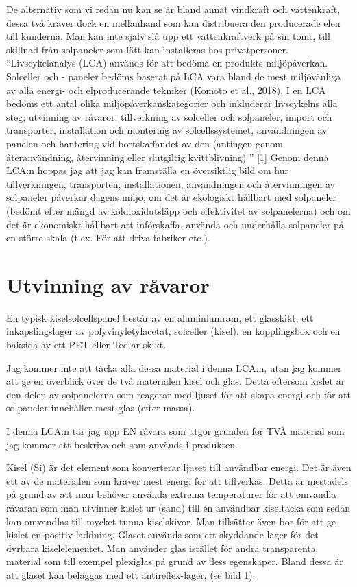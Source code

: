 \documentclass{article}
\begin{document}
De alternativ som vi redan nu kan se är bland annat vindkraft och vattenkraft, dessa två kräver dock en mellanhand som kan distribuera den producerade elen till kunderna. Man kan inte själv slå upp ett vattenkraftverk på sin tomt, till skillnad från solpaneler som lätt kan installeras hos privatpersoner.
\pagebreak
\newline
“Livscykelanalys (LCA) används för att bedöma en produkts miljöpåverkan. Solceller och - paneler bedöms baserat på LCA vara bland de mest miljövänliga av alla energi- och elproducerande tekniker (Komoto et al., 2018). I en LCA bedöms ett antal olika miljöpåverkanskategorier och inkluderar livscykelns alla steg; utvinning av råvaror; tillverkning av solceller och solpaneler, import och transporter, installation och montering av 
solcellssystemet, användningen av panelen och hantering vid bortskaffandet av den (antingen genom återanvändning, återvinning eller slutgiltig kvittblivning)
” [1]\newline
Genom denna LCA:n hoppas jag att jag kan framställa en översiktlig bild om hur tillverkningen, transporten, installationen, användningen och återvinningen av solpaneler påverkar dagens miljö, om det är ekologiskt hållbart med solpaneler (bedömt efter mängd av koldioxidutsläpp och effektivitet av solpanelerna) och om det är ekonomiskt hållbart att införskaffa, använda och underhålla solpaneler på en större skala (t.ex. För att driva fabriker etc.). 
\pagebreak
\section{Utvinning av råvaror}
En typisk kiselsolcellspanel består av en aluminiumram, ett glasskikt, ett inkapslingslager av 
polyvinyletylacetat, solceller (kisel), en kopplingsbox och en baksida av ett PET eller Tedlar-skikt.

Jag kommer inte att täcka alla dessa material i denna LCA:n, utan jag kommer att ge en överblick över de två materialen kisel och glas. Detta eftersom kislet är den delen av solpanelerna som reagerar med ljuset för att skapa energi och för att solpaneler innehåller mest glas (efter massa).

I denna LCA:n tar jag upp EN råvara som utgör grunden för TVÅ material som jag kommer att beskriva och som används i produkten.

Kisel (Si) är det element som konverterar ljuset till användbar energi. Det är även ett av de materialen som kräver mest energi för att tillverkas. Detta är mestadels på grund av att man behöver använda extrema temperaturer för att omvandla råvaran som man utvinner kislet ur (sand) till en användbar kiseltacka som sedan kan omvandlas till mycket tunna kiselskivor. Man tillsätter även bor för att ge kislet en positiv laddning.
Glaset används som ett skyddande lager för det dyrbara kiselelementet. Man använder glas istället för andra transparenta material som till exempel plexiglas på grund av dess egenskaper. Bland dessa är att glaset kan beläggas med ett antireflex-lager, (se bild 1).
\end{document}
